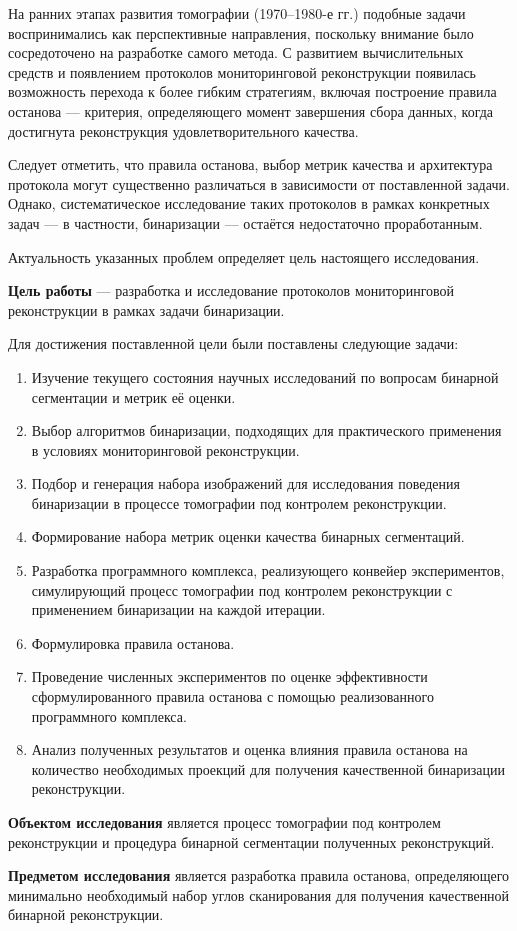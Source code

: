 На ранних этапах развития томографии (1970–1980-е гг.) подобные задачи воспринимались как перспективные направления, поскольку внимание было сосредоточено на разработке самого метода. С развитием вычислительных средств и появлением протоколов мониторинговой реконструкции появилась возможность перехода к более гибким стратегиям, включая построение правила останова — критерия, определяющего момент завершения сбора данных, когда достигнута реконструкция удовлетворительного качества.

Следует отметить, что правила останова, выбор метрик качества и архитектура протокола могут существенно различаться в зависимости от поставленной задачи. Однако, систематическое исследование таких протоколов в рамках конкретных задач — в частности, бинаризации — остаётся недостаточно проработанным.

Актуальность указанных проблем определяет цель настоящего исследования. 

\textbf{Цель работы} — разработка и исследование протоколов мониторинговой реконструкции в рамках задачи бинаризации.

Для достижения поставленной цели были поставлены следующие задачи:

\begin{enumerate}
    \item Изучение текущего состояния научных исследований по вопросам бинарной сегментации и метрик её оценки.
    \item Выбор алгоритмов бинаризации, подходящих для практического применения в условиях мониторинговой реконструкции.
    \item Подбор и генерация набора изображений для исследования поведения бинаризации в процессе томографии под контролем реконструкции.
    \item Формирование набора метрик оценки качества бинарных сегментаций.
    \item Разработка программного комплекса, реализующего конвейер экспериментов, симулирующий процесс томографии под контролем реконструкции с применением бинаризации на каждой итерации.
    \item Формулировка правила останова.
    \item Проведение численных экспериментов по оценке эффективности сформулированного правила останова с помощью реализованного программного комплекса.
    \item Анализ полученных результатов и оценка влияния правила останова на количество необходимых проекций для получения качественной бинаризации реконструкции.
\end{enumerate}

\textbf{Объектом исследования} является процесс томографии под контролем реконструкции и процедура бинарной сегментации полученных реконструкций.

\textbf{Предметом исследования} является разработка правила останова, определяющего минимально необходимый набор углов сканирования для получения качественной бинарной реконструкции.
